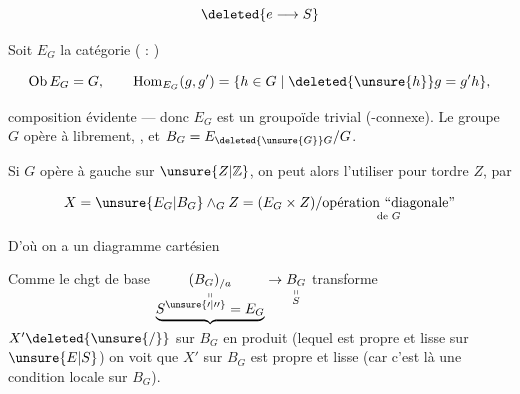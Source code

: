 
\[
\deleted{e\longrightarrow S}
\]

 Soit $E_G$ la catégorie   ( : )

\[
\mathrm{Ob}\,E_G=G,\qquad \mathrm{Hom}_{E_G}(g,g')=\{h\in G\mid\deleted{\unsure{h}}g=g'h\},
\]

composition évidente --- donc $E_G$ est un groupoïde trivial (-connexe). Le groupe $G$  opère à  librement, , et $B_G=E_{\deleted{\unsure{G}}G}/G$.


Si $G$ opère à gauche sur $\unsure{Z|\mathbb Z}$, on peut alors l'utiliser pour tordre $Z$, par

\[
X=\unsure{E_G|B_G}\wedge_G Z=(E_G\times Z)/\underset{\text{de }G}{\text{opération ``diagonale''}}
\]

D'où on a un diagramme cartésien


 Comme le chgt de base $\underset{\substack{\shortparallel\\\underbrace{S^{\unsure{\prime|\prime\prime}}=E_G}}}{(B_G)_{/a}}\to\underset{\substack{\shortparallel\\ S}}{B_G}$ transforme $X'\deleted{\unsure{/}}$ sur $B_G$ en produit (lequel est  propre et lisse sur $\unsure{E|S}$) on voit que $X'$ sur $B_G$ est  propre et lisse (car c'est là une condition locale sur $B_G$).

